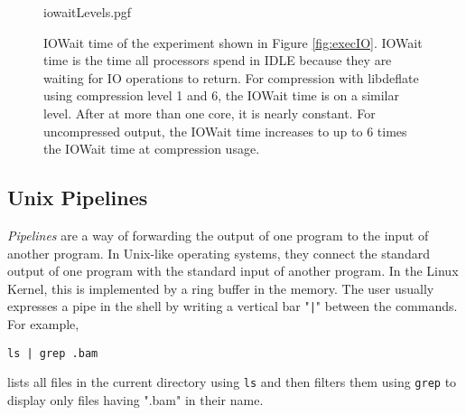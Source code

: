 \begin{figure}
        {iowaitLevels.pgf}
    \caption{IOWait time of the experiment shown in Figure \ref{fig:execIO}. IOWait time is the time all processors spend in IDLE because they are waiting for IO operations to return. For compression with libdeflate using compression level 1 and 6, the IOWait time is on a similar level. After at more than one core, it is nearly constant. For uncompressed output, the IOWait time increases to up to 6 times the IOWait time at compression usage. }
    \label{fig:iowait}
\end{figure}



\subsection{Unix Pipelines}

\textit{Pipelines} are a way of forwarding the output of one program to the input of another program. In Unix-like operating systems, they connect the standard output of one program with the standard input of another program. In the Linux Kernel, this is implemented \cite{noauthor_linuxfspipec_nodate} by a ring buffer in the memory. The user usually expresses a pipe in the shell by writing a vertical bar "\texttt{|}" between the commands. For example, 
\begin{verbatim} 
ls | grep .bam 
\end{verbatim}
lists all files in the current directory using \texttt{ls} and then filters them using \texttt{grep} to display only files having ".bam" in their name. 

